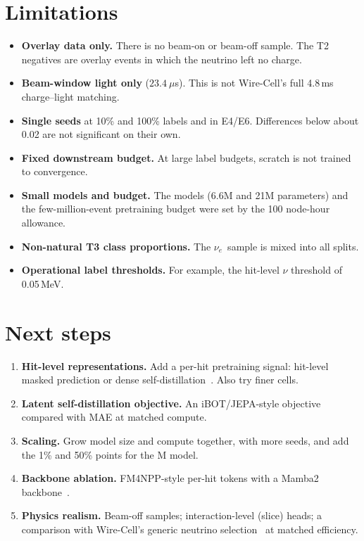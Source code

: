 \documentclass[11pt,a4paper]{article}
\newcommand{\nue}{\ensuremath{\nu_e}}
\begin{document}
\section{Limitations}
\begin{itemize}
  \item \textbf{Overlay data only.} There is no beam-on or beam-off sample. The T2 negatives are overlay events in which the neutrino left no charge.
  \item \textbf{Beam-window light only} ($23.4~\mu$s). This is not Wire-Cell's full 4.8\,ms charge--light matching.
  \item \textbf{Single seeds} at 10\% and 100\% labels and in E4/E6. Differences below about 0.02 are not significant on their own.
  \item \textbf{Fixed downstream budget.} At large label budgets, scratch is not trained to convergence.
  \item \textbf{Small models and budget.} The models (6.6M and 21M parameters) and the few-million-event pretraining budget were set by the 100 node-hour allowance.
  \item \textbf{Non-natural T3 class proportions.} The \nue\ sample is mixed into all splits.
  \item \textbf{Operational label thresholds.} For example, the hit-level $\nu$ threshold of 0.05\,MeV.
\end{itemize}

\section{Next steps}\label{sec:next}
\begin{enumerate}
  \item \textbf{Hit-level representations.} Add a per-hit pretraining signal: hit-level masked prediction or dense self-distillation~\cite{panda,sonata}. Also try finer cells.
  \item \textbf{Latent self-distillation objective.} An iBOT/JEPA-style objective~\cite{ijepa} compared with MAE at matched compute.
  \item \textbf{Scaling.} Grow model size and compute together, with more seeds, and add the 1\% and 50\% points for the M model.
  \item \textbf{Backbone ablation.} FM4NPP-style per-hit tokens with a Mamba2 backbone~\cite{fm4npp}.
  \item \textbf{Physics realism.} Beam-off samples; interaction-level (slice) heads; a comparison with Wire-Cell's generic neutrino selection~\cite{wcgeneric} at matched efficiency.
\end{enumerate}
\end{document}
